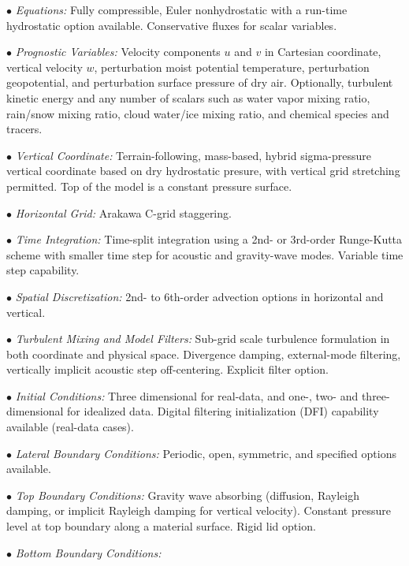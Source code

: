 \begin{description}
\setlength{\itemsep}{-5pt}
\item{$\bullet$} {\em Equations:}
Fully compressible, Euler nonhydrostatic with 
a run-time hydrostatic option available. Conservative fluxes for scalar variables.
%
\item{$\bullet$} {\em Prognostic Variables:}
Velocity components $u$ and $v$ in Cartesian coordinate, vertical velocity $w$, 
perturbation moist potential temperature, perturbation geopotential, 
and perturbation surface pressure of dry air.
Optionally, turbulent kinetic energy and any number of scalars
such as water vapor mixing ratio, rain/snow mixing ratio,
cloud water/ice mixing ratio, and chemical species and tracers.
%
\item{$\bullet$} {\em Vertical Coordinate:}
Terrain-following, mass-based, hybrid sigma-pressure vertical coordinate based on dry hydrostatic presure, 
with vertical grid stretching permitted.
Top of the model is a constant pressure surface.
%
\item{$\bullet$} {\em Horizontal Grid:}
Arakawa C-grid staggering. 
%
\item{$\bullet$} {\em Time Integration:}
Time-split integration using a 2nd- or 3rd-order Runge-Kutta scheme with
smaller time step for acoustic and gravity-wave modes. 
Variable time step capability.
%
\item{$\bullet$} {\em Spatial Discretization:}
2nd- to 6th-order advection options in horizontal and vertical.
%
\item{$\bullet$} {\em Turbulent Mixing and Model Filters:} Sub-grid scale
turbulence formulation in both coordinate and physical space.
Divergence damping, external-mode filtering, vertically implicit
acoustic step off-centering. Explicit filter option.
%
\item{$\bullet$} {\em Initial Conditions:}
Three dimensional for real-data, and one-, two- and 
three-dimensional for idealized data. 
Digital filtering initialization (DFI) capability 
available (real-data cases).
%
\item{$\bullet$} {\em Lateral Boundary Conditions:} 
Periodic, open, symmetric, and specified options available.
%
\item{$\bullet$} {\em Top Boundary Conditions:} 
Gravity wave absorbing (diffusion, Rayleigh damping, or implicit 
Rayleigh damping for vertical velocity).  
Constant pressure level at top boundary along a material surface. 
Rigid lid option.
%
\item{$\bullet$} {\em Bottom Boundary Conditions:} 

\end{description}
